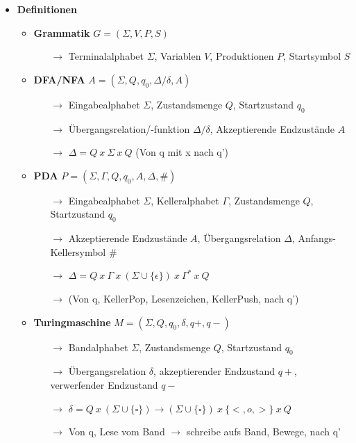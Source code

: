 \begin{itemize}
\item {\large \textbf{Definitionen}}
	\begin{itemize}
	\item \textbf{Grammatik} $G = (\Sigma, V, P, S)$
		\begin{itemize}
		\item[$\rightarrow$] Terminalalphabet $\Sigma$, Variablen $V$, Produktionen $P$, Startsymbol $S$
		\end{itemize}
	\item \textbf{DFA/NFA} $A= (\Sigma, Q, q_0, \Delta/\delta, A)$
		\begin{itemize}
		\item[$\rightarrow$] Eingabealphabet $\Sigma$, Zustandsmenge $Q$, Startzustand $q_0$
		\item[$\rightarrow$] Übergangsrelation/-funktion $\Delta/\delta$, Akzeptierende Endzustände $A$
		\item[$\rightarrow$] $\Delta = Q~x~\Sigma~x~Q$ (Von q mit x nach q')
		\end{itemize}
		
	\item \textbf{PDA} $P = (\Sigma, \Gamma, Q, q_0, A, \Delta, \#)$
		\begin{itemize}
		\item[$\rightarrow$] Eingabealphabet $\Sigma$, Kelleralphabet $\Gamma$, Zustandsmenge $Q$, Startzustand $q_0$
		\item[$\rightarrow$] Akzeptierende Endzustände $A$, Übergangsrelation $\Delta$, Anfangs-Kellersymbol $\#$
		\item[$\rightarrow$] $\Delta = Q~x~\Gamma~x~(\Sigma \cup \{\epsilon\})~x~\Gamma^*~x~Q$
		\item[$\rightarrow$] (Von q, KellerPop, Lesenzeichen, KellerPush, nach q')
		\end{itemize}
		
	\item \textbf{Turingmaschine} $M = (\Sigma, Q, q_0, \delta, q+, q-)$
		\begin{itemize}
		\item[$\rightarrow$] Bandalphabet $\Sigma$, Zustandsmenge $Q$, Startzustand $q_0$
		\item[$\rightarrow$] Übergangsrelation $\delta$, akzeptierender Endzustand $q+$, verwerfender Endzustand $q-$
		\item[$\rightarrow$] $\delta = Q~x~(\Sigma \cup \{\square\}) \rightarrow (\Sigma \cup \{\square\})~x~\{<,o,>\}~x~Q$
		\item[$\rightarrow$] Von q, Lese vom Band $\rightarrow$ schreibe aufs Band, Bewege, nach q'
		\end{itemize}
	

\end{itemize}
\end{itemize}
